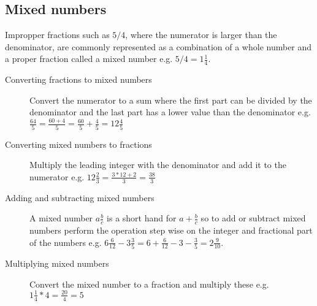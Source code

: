 \subsection{Mixed numbers}
Impropper fractions such as $5/4$, where the numerator is larger than the
denominator, are commonly represented as a combination of a whole number
and a proper fraction called a mixed number e.g. $5/4 = 1\frac{1}{4}$.
\begin{description}
\item [Converting fractions to mixed numbers] Convert the numerator to a sum
where the first part can be divided by the denominator and the last part has
a lower value than the denominator e.g. $\frac{64}{5} = \frac{60 + 4}{5} =
\frac{60}{5} + \frac{4}{5} = 12 \frac{4}{5}$
\item [Converting mixed numbers to fractions] Multiply the leading integer
with the denominator and add it to the numerator e.g. $12 \frac{2}{3} =
\frac{3 * 12 + 2}{3} = \frac{38}{3}$
\item [Adding and subtracting mixed numbers] A mixed number $a \frac{b}{c}$
is a short hand for $a + \frac{b}{c}$ so to add or subtract mixed numbers
perform the operation step wise on the integer and fractional part of the
numbers e.g. $6\frac{6}{12} - 3\frac{3}{5} =
6 + \frac{6}{12} - 3 - \frac{3}{5} = 2\frac{9}{10}$.
\item [Multiplying mixed numbers] Convert the mixed number to a fraction and
multiply these e.g. $1\frac{1}{4} * 4 = \frac{20}{4} = 5$
\end{description}


